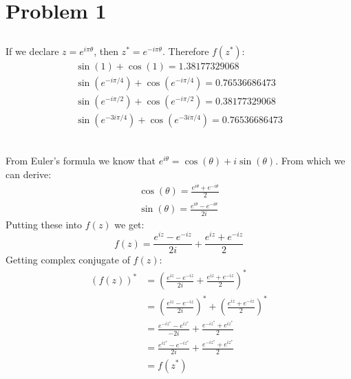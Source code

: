 \documentclass[12pt]{article}
\begin{document}
\renewcommand{\familydefault}{\rmdefault}



\section{Problem 1}
\subsection{}
If we declare $z = e^{i\pi\theta}$, then $z^* = e^{-i\pi\theta}$. Therefore $f(z^*)$:
\begin{equation}
    \begin{gathered}
        \sin(1) + \cos(1) = 1.38177329068\\
        \sin(e^{-i\pi/4}) + \cos(e^{-i\pi/4}) = 0.76536686473\\
        \sin(e^{-i\pi/2}) + \cos(e^{-i\pi/2}) =  0.38177329068\\
        \sin(e^{-3i\pi/4}) + \cos(e^{-3i\pi/4}) = 0.76536686473\\
    \end{gathered}
\end{equation}
\subsection{}
From Euler's formula we know that $e^{i\theta} = \cos(\theta) + i\sin(\theta)$. From which we can derive:
\begin{equation}
    \label {eq:cos}
    \begin{gathered}
        \cos(\theta) = \frac{e^{i\theta} + e^{-i\theta}}{2}\\
        \sin(\theta) = \frac{e^{i\theta} - e^{-i\theta}}{2i}
    \end{gathered}
\end{equation}
Putting these into $f(z)$ we get:
\begin{equation}
    f(z) = \frac{e^{iz}-e^{-iz}}{2i} + \frac{e^{iz}+e^{-iz}}{2}
\end{equation}
Getting complex conjugate of $f(z)$:
\begin{equation}
    \begin{split}
        (f(z))^* &= \left(\frac{e^{iz}-e^{-iz}}{2i} + \frac{e^{iz}+e^{-iz}}{2}\right)^*\\
        &= \left(\frac{e^{iz}-e^{-iz}}{2i}\right)^* + \left(\frac{e^{iz}+e^{-iz}}{2}\right)^*\\
        &= \frac{e^{-iz^*}-e^{iz^*}}{-2i} + \frac{e^{-iz^*}+e^{iz^*}}{2}\\
        &= \frac{e^{iz^*}-e^{-iz^*}}{2i} + \frac{e^{-iz^*}+e^{iz^*}}{2}\\
        &= f(z^*)
    \end{split}
\end{equation} 
\end{document}
